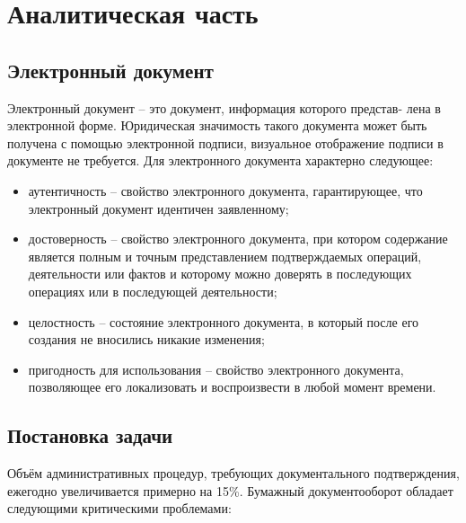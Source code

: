\section{Аналитическая часть}

\subsection{Электронный документ}

Электронный документ – это документ, информация которого представ-
лена в электронной форме. Юридическая значимость такого документа может
быть получена с помощью электронной подписи, визуальное отображение подписи в документе не требуется\cite{dadaya}. Для электронного документа характерно следующее:

\begin{itemize}[label=---]
	\item аутентичность -- свойство электронного документа, гарантирующее, что электронный документ идентичен заявленному;
	
	\item достоверность -- свойство электронного документа, при котором содержание является полным и точным представлением подтверждаемых операций, деятельности или фактов и которому можно доверять в последующих операциях или в последующей деятельности;
	
	\item целостность -- состояние электронного документа, в который после его создания не вносились никакие изменения;
	
	\item пригодность для использования -- свойство электронного документа, позволяющее его локализовать и воспроизвести в любой момент времени.
\end{itemize}

\subsection{Постановка задачи}

Объём административных процедур, требующих документального подтверждения, ежегодно увеличивается примерно на 15\%\cite{dadaya}. Бумажный документооборот обладает следующими критическими проблемами:
 

